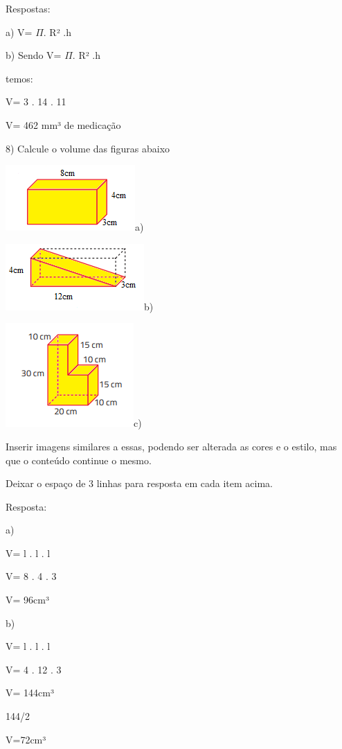 Respostas:

a) V= \(\Pi\). R² .h

b) Sendo V= \(\Pi\). R² .h

temos:

V= 3 . 14 . 11

V= 462 mm³ de medicação

8) Calcule o volume das figuras abaixo

\includegraphics[width=1.94792in,height=0.98958in]{./imgSAEB_8_MAT/media/image51.png}a)

\includegraphics[width=2.08333in,height=1in]{./imgSAEB_8_MAT/media/image52.png}b)

\includegraphics[width=1.92708in,height=1.5625in]{./imgSAEB_8_MAT/media/image53.png}c)

Inserir imagens similares a essas, podendo ser alterada as cores e o
estilo, mas que o conteúdo continue o mesmo.

Deixar o espaço de 3 linhas para resposta em cada item acima.

Resposta:

a)

V= l . l . l

V= 8 . 4 . 3

V= 96cm³

b)

V= l . l . l

V= 4 . 12 . 3

V= 144cm³

144/2

V=72cm³

